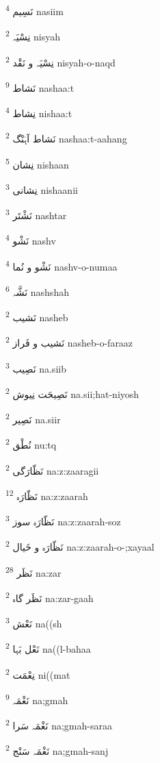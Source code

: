 \documentclass[12pt]{article}
\begin{document}
\begin{RTL}
\begin{multicols}{5}
{\ur نَسِیم}   \textsuperscript{4} nasiim

{\ur نِسْیَہ}   \textsuperscript{2} nisyah

{\ur نِسْیَہ و نَقْد}   \textsuperscript{2} nisyah-o-naqd

{\ur نَشاط}   \textsuperscript{9} nashaa:t

{\ur نِشاط}   \textsuperscript{4} nishaa:t

{\ur نَشاط آہَنْگ}   \textsuperscript{2} nashaa:t-aahang

{\ur نِشان}   \textsuperscript{5} nishaan

{\ur نِشانی}   \textsuperscript{3} nishaanii

{\ur نَشْتَر}   \textsuperscript{3} nashtar

{\ur نَشْو}   \textsuperscript{4} nashv

{\ur نَشْو و نُما}   \textsuperscript{4} nashv-o-numaa

{\ur نَشَّہ}   \textsuperscript{6} nashshah

{\ur نَشیب}   \textsuperscript{2} nasheb

{\ur نَشیب و فَراز}   \textsuperscript{2} nasheb-o-faraaz

{\ur نَصِیب}   \textsuperscript{3} na.siib

{\ur نَصِیحَت نِیوش}   \textsuperscript{2} na.sii;hat-niyosh

{\ur نَصِیر}   \textsuperscript{2} na.siir

{\ur نُطْق}   \textsuperscript{2} nu:tq

{\ur نَظّارَگی}   \textsuperscript{2} na:z:zaaragii

{\ur نَظّارَہ}   \textsuperscript{12} na:z:zaarah

{\ur نَظّارَہ سوز}   \textsuperscript{3} na:z:zaarah-soz

{\ur نَظّارَہ و خَیال}   \textsuperscript{2} na:z:zaarah-o-;xayaal

{\ur نَظَر}   \textsuperscript{28} na:zar

{\ur نَظَر گاہ}   \textsuperscript{2} na:zar-gaah

{\ur نَعْش}   \textsuperscript{3} na((sh

{\ur نَعْل بَہا}   \textsuperscript{2} na((l-bahaa

{\ur نِعْمَت}   \textsuperscript{2} ni((mat

{\ur نَغْمَہ}   \textsuperscript{9} na;gmah

{\ur نَغْمَہ سَرا}   \textsuperscript{2} na;gmah-saraa

{\ur نَغْمَہ سَنْج}   \textsuperscript{2} na;gmah-sanj


\end{multicols}
\end{RTL}
\end{document}
